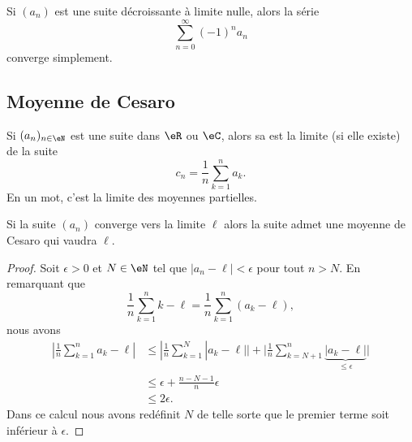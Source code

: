 \begin{corollary}       \label{CoreMjIfw}
    Si \( (a_n)\) est une suite décroissante à limite nulle, alors la série
  \begin{equation}
    \sum_{n=0}^\infty {(-1)}^n a_n
  \end{equation}
  converge simplement.
\end{corollary}

\subsection{Moyenne de Cesaro}

Si \( (a_n)_{n\in \eN} \) est une suite dans \( \eR\) ou \( \eC\), alors sa  est la limite (si elle existe) de la suite
\begin{equation}
    c_n=\frac{1}{ n }\sum_{k=1}^na_k.
\end{equation}
En un mot, c'est la limite des moyennes partielles.

\begin{lemma}       \label{LemyGjMqM}
    Si la suite \( (a_n)\) converge vers la limite \( \ell\) alors la suite admet une moyenne de Cesaro qui vaudra \( \ell\).
\end{lemma}

\begin{proof}
    Soit \( \epsilon>0\) et \( N\in \eN\) tel que \( | a_n-\ell |<\epsilon\) pour tout \( n>N\). En remarquant que
    \begin{equation}
        \frac{1}{ n }\sum_{k=1}^nk-\ell=\frac{1}{ n }\sum_{k=1}^n(a_k-\ell),
    \end{equation}
    nous avons
    \begin{subequations}
        \begin{align}
            | \frac{1}{ n }\sum_{k=1}^na_k-\ell |&\leq| \frac{1}{ n }\sum_{k=1}^N| a_k-\ell | |+\big| \frac{1}{ n }\sum_{k=N+1}^n\underbrace{| a_k-\ell |}_{\leq \epsilon} \big|\\
            &\leq \epsilon+\frac{ n-N-1 }{ n }\epsilon\\
            &\leq 2\epsilon.
        \end{align}
    \end{subequations}
    Dans ce calcul nous avons redéfinit \( N\) de telle sorte que le premier terme soit inférieur à \( \epsilon\).
\end{proof}


